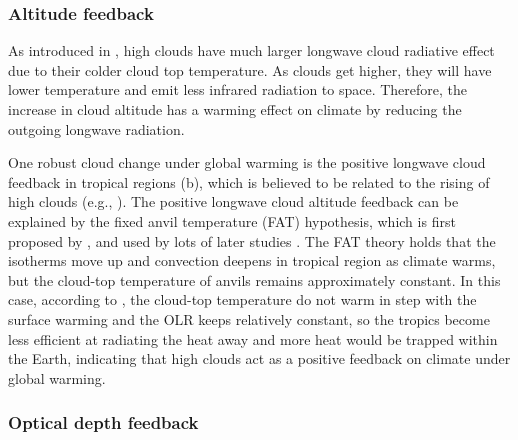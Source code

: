 
\subsubsection{Altitude feedback}

As introduced in , high clouds have much larger longwave cloud radiative effect due to their colder cloud top temperature. As clouds get higher, they will have lower temperature and emit less infrared radiation to space. Therefore, the increase in cloud altitude has a warming effect on climate by reducing the outgoing longwave radiation. 

One robust cloud change under global warming is the positive longwave cloud feedback in tropical regions (b), which is believed to be related to the rising of high clouds (e.g., \citealt{Wetherald1988cloud}).  
The positive longwave cloud altitude feedback can be explained by the fixed anvil temperature (FAT) hypothesis, which is first proposed by \cite{Hartmann2002FAT}, and used by lots of later studies \cite[e.g.,][]{Kuang2007,Zelinka2010longwave,Yoshimori2020fixed}. The FAT theory holds that the isotherms move up and convection deepens in tropical region as climate warms, but the cloud-top temperature of anvils remains approximately constant. In this case, according to , the cloud-top temperature do not warm in step with the surface warming and the OLR keeps relatively constant, so the tropics become less efficient at radiating the heat away and more heat would be trapped within the Earth, indicating that high clouds act as a positive feedback on climate under global warming.

\subsubsection{Optical depth feedback}

